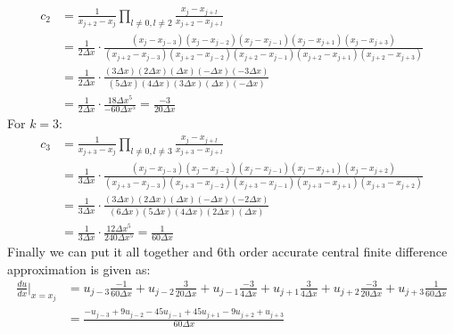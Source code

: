 \begin{equation}
	\begin{aligned}
		c_{2} & = \frac{1}{x_{j+2} - x_j} \prod_{l \neq 0, l \neq 2} \frac{x_j - x_{j+l}}{x_{j+2} - x_{j+l}}                                                                                                                    \\
		      & = \frac{1}{2\Delta x} \cdot \frac{(x_j - x_{j-3})(x_j - x_{j-2})(x_j - x_{j-1})(x_j - x_{j+1})(x_j - x_{j+3})}{(x_{j+2} - x_{j-3})(x_{j+2} - x_{j-2})(x_{j+2} - x_{j-1})(x_{j+2} - x_{j+1})(x_{j+2} - x_{j+3})} \\
		      & = \frac{1}{2\Delta x} \cdot \frac{(3\Delta x)(2\Delta x)(\Delta x)(-\Delta x)(-3\Delta x)}{(5\Delta x)(4\Delta x)(3\Delta x)(\Delta x)(-\Delta x)}                                                                 \\
		      & = \frac{1}{2\Delta x} \cdot \frac{18 \Delta x^5}{-60 \Delta x^5} = \frac{-3}{20\Delta x}
	\end{aligned}
\end{equation}
For $k = 3$:
\begin{equation}
	\begin{aligned}
		c_{3} & = \frac{1}{x_{j+3} - x_j} \prod_{l \neq 0, l \neq 3} \frac{x_j - x_{j+l}}{x_{j+3} - x_{j+l}}                                                                                                                    \\
		      & = \frac{1}{3\Delta x} \cdot \frac{(x_j - x_{j-3})(x_j - x_{j-2})(x_j - x_{j-1})(x_j - x_{j+1})(x_j - x_{j+2})}{(x_{j+3} - x_{j-3})(x_{j+3} - x_{j-2})(x_{j+3} - x_{j-1})(x_{j+3} - x_{j+1})(x_{j+3} - x_{j+2})} \\
		      & = \frac{1}{3\Delta x} \cdot \frac{(3\Delta x)(2\Delta x)(\Delta x)(-\Delta x)(-2\Delta x)}{(6\Delta x)(5\Delta x)(4\Delta x)(2\Delta x)(\Delta x)}                                                                \\
		      & = \frac{1}{3\Delta x} \cdot \frac{12 \Delta x^5}{240 \Delta x^5} = \frac{1}{60\Delta x}
	\end{aligned}
\end{equation}
Finally we can put it all together and 6th order accurate central finite difference approximation is given as:
\begin{equation}
	\begin{aligned}
		\frac{du}{dx} \bigg\vert_{x=x_j} &= u_{j-3} \frac{-1}{60\Delta x} +  u_{j-2} \frac{3}{20\Delta x} + u_{j-1} \frac{-3}{4\Delta x} + u_{j+1} \frac{3}{4\Delta x} + u_{j+2} \frac{-3}{20\Delta x} + u_{j+3}  \frac{1}{60\Delta x}\\
		&= \frac{-u_{j-3} + 9u_{j-2} - 45u_{j-1} + 45u_{j+1} - 9u_{j+2} + u_{j+3} }{60 \Delta x}
	\end{aligned}
	\label{eq:final}
\end{equation}
